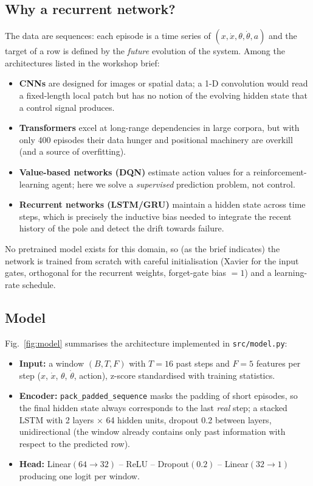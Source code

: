 \documentclass[conference]{IEEEtran}
\begin{document}
\subsection{Why a recurrent network?}
The data are sequences: each episode is a time series of
$(x, \dot x, \theta, \dot\theta, a)$ and the target of a row is defined by the
\emph{future} evolution of the system. Among the architectures listed in the
workshop brief:
\begin{itemize}
\item \textbf{CNNs} are designed for images or spatial data; a 1-D convolution
      would read a fixed-length local patch but has no notion of the evolving
      hidden state that a control signal produces.
\item \textbf{Transformers} excel at long-range dependencies in large corpora,
      but with only 400 episodes their data hunger and positional machinery
      are overkill (and a source of overfitting).
\item \textbf{Value-based networks (DQN)} estimate action values for a
      reinforcement-learning agent; here we solve a \emph{supervised}
      prediction problem, not control.
\item \textbf{Recurrent networks (LSTM/GRU)} maintain a hidden state across
      time steps, which is precisely the inductive bias needed to integrate
      the recent history of the pole and detect the drift towards failure.
\end{itemize}
No pretrained model exists for this domain, so (as the brief indicates) the
network is trained from scratch with careful initialisation (Xavier for the
input gates, orthogonal for the recurrent weights, forget-gate bias $=1$) and
a learning-rate schedule.

\subsection{Model}
Fig.~\ref{fig:model} summarises the architecture implemented in
\texttt{src/model.py}:

\begin{itemize}
\item \textbf{Input:} a window $(B, T, F)$ with $T=16$ past steps and
      $F=5$ features per step ($x$, $\dot x$, $\theta$, $\dot\theta$,
      action), z-score standardised with training statistics.
\item \textbf{Encoder:} \texttt{pack\_padded\_sequence} masks the padding of
      short episodes, so the final hidden state always corresponds to the
      last \emph{real} step; a stacked LSTM with 2 layers $\times$ 64 hidden
      units, dropout 0.2 between layers, unidirectional (the window already
      contains only past information with respect to the predicted row).
\item \textbf{Head:} Linear$(64 \rightarrow 32)$ -- ReLU -- Dropout$(0.2)$ --
      Linear$(32 \rightarrow 1)$ producing one logit per window.
\end{itemize}
\end{document}
